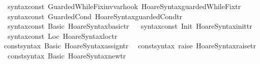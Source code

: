 \begin{isabellebody}
\ \ {\isacharparenleft}{\isacharat}{\isacharbraceleft}syntax{\isacharunderscore}const\ {\isachardoublequote}{\isacharunderscore}GuardedWhileFix{\isacharunderscore}inv{\isacharunderscore}var{\isacharunderscore}hook{\isachardoublequote}{\isacharbraceright}{\isacharcomma}\ Hoare{\isacharunderscore}Syntax{\isachardot}guarded{\isacharunderscore}WhileFix{\isacharunderscore}tr{\isacharparenright}{\isacharcomma}\isanewline
\ \ {\isacharparenleft}{\isacharat}{\isacharbraceleft}syntax{\isacharunderscore}const\ {\isachardoublequote}{\isacharunderscore}GuardedCond{\isachardoublequote}{\isacharbraceright}{\isacharcomma}\ Hoare{\isacharunderscore}Syntax{\isachardot}guarded{\isacharunderscore}Cond{\isacharunderscore}tr{\isacharparenright}{\isacharcomma}\isanewline
\ \ {\isacharparenleft}{\isacharat}{\isacharbraceleft}syntax{\isacharunderscore}const\ {\isachardoublequote}{\isacharunderscore}Basic{\isachardoublequote}{\isacharbraceright}{\isacharcomma}\ Hoare{\isacharunderscore}Syntax{\isachardot}basic{\isacharunderscore}tr{\isacharparenright}{\isacharbrackright}\isanewline
{\isacartoucheclose}\isanewline
\isanewline
{}\isamarkupfalse%
\ {\isacartoucheopen}\isanewline
\ {\isacharbrackleft}{\isacharparenleft}{\isacharat}{\isacharbraceleft}syntax{\isacharunderscore}const\ {\isachardoublequote}{\isacharunderscore}Init{\isachardoublequote}{\isacharbraceright}{\isacharcomma}\ Hoare{\isacharunderscore}Syntax{\isachardot}init{\isacharunderscore}tr{\isacharparenright}{\isacharcomma}\isanewline
\ \ {\isacharparenleft}{\isacharat}{\isacharbraceleft}syntax{\isacharunderscore}const\ {\isachardoublequote}{\isacharunderscore}Loc{\isachardoublequote}{\isacharbraceright}{\isacharcomma}\ Hoare{\isacharunderscore}Syntax{\isachardot}loc{\isacharunderscore}tr{\isacharparenright}{\isacharbrackright}\ \isanewline
{\isacartoucheclose}\isanewline
\isanewline
\isanewline
{}\isamarkupfalse%
\ {\isacartoucheopen}\isanewline
\ {\isacharbrackleft}{\isacharparenleft}{\isacharat}{\isacharbraceleft}const{\isacharunderscore}syntax\ Basic{\isacharbraceright}{\isacharcomma}\ Hoare{\isacharunderscore}Syntax{\isachardot}assign{\isacharunderscore}tr{\isacharprime}{\isacharparenright}{\isacharcomma}\isanewline
\ \ {\isacharparenleft}{\isacharat}{\isacharbraceleft}const{\isacharunderscore}syntax\ raise{\isacharbraceright}{\isacharcomma}\ Hoare{\isacharunderscore}Syntax{\isachardot}raise{\isacharunderscore}tr{\isacharprime}{\isacharparenright}{\isacharcomma}\isanewline
\ \ {\isacharparenleft}{\isacharat}{\isacharbraceleft}const{\isacharunderscore}syntax\ Basic{\isacharbraceright}{\isacharcomma}\ Hoare{\isacharunderscore}Syntax{\isachardot}new{\isacharunderscore}tr{\isacharprime}{\isacharparenright}{\isacharcomma}\isanewline

\end{isabellebody}
